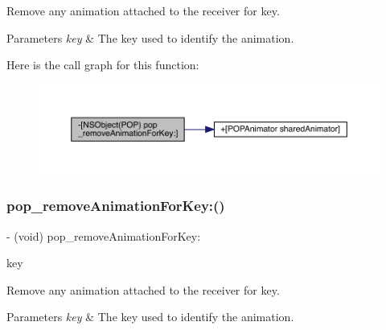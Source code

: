 Remove any animation attached to the receiver for \textquotesingle{}key\textquotesingle{}. 
\begin{DoxyParams}{Parameters}
{\em key} & The key used to identify the animation. \\
\hline
\end{DoxyParams}
Here is the call graph for this function\+:\nopagebreak
\begin{figure}[H]
\begin{center}
\leavevmode
\includegraphics[width=350pt]{category_n_s_object_07_p_o_p_08_a8ac27f1251e5b55eb426e829265d23b6_cgraph}
\end{center}
\end{figure}
\mbox{\label{category_n_s_object_07_p_o_p_08_a8ac27f1251e5b55eb426e829265d23b6}} 
\subsubsection{\texorpdfstring{pop\+\_\+remove\+Animation\+For\+Key\+:()}{pop\_removeAnimationForKey:()}\hspace{0.1cm}{\footnotesize\ttfamily [2/3]}}
{\footnotesize\ttfamily -\/ (void) pop\+\_\+remove\+Animation\+For\+Key\+: \begin{DoxyParamCaption}\item[{(N\+S\+String $\ast$)}]{key }\end{DoxyParamCaption}}

Remove any animation attached to the receiver for \textquotesingle{}key\textquotesingle{}. 
\begin{DoxyParams}{Parameters}
{\em key} & The key used to identify the animation. \\
\hline
\end{DoxyParams}
\mbox{\label{category_n_s_object_07_p_o_p_08_a8ac27f1251e5b55eb426e829265d23b6}} 

